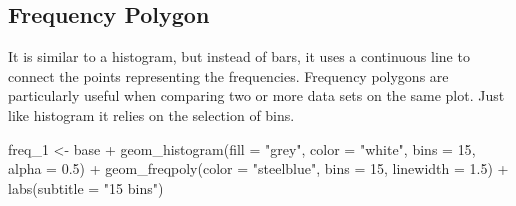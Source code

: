 \documentclass[
  letterpaper,
]{book}
\newenvironment{Shaded}{\begin{snugshade}}{\end{snugshade}}
\newcommand{\AttributeTok}[1]{\textcolor[rgb]{0.40,0.45,0.13}{#1}}
\newcommand{\DecValTok}[1]{\textcolor[rgb]{0.68,0.00,0.00}{#1}}
\newcommand{\FloatTok}[1]{\textcolor[rgb]{0.68,0.00,0.00}{#1}}
\newcommand{\FunctionTok}[1]{\textcolor[rgb]{0.28,0.35,0.67}{#1}}
\newcommand{\NormalTok}[1]{\textcolor[rgb]{0.00,0.23,0.31}{#1}}
\newcommand{\OtherTok}[1]{\textcolor[rgb]{0.00,0.23,0.31}{#1}}
\newcommand{\SpecialCharTok}[1]{\textcolor[rgb]{0.37,0.37,0.37}{#1}}
\newcommand{\StringTok}[1]{\textcolor[rgb]{0.13,0.47,0.30}{#1}}
\begin{document}
\hypertarget{frequency-polygon}{%
\subsection{Frequency Polygon}\label{frequency-polygon}}

It is similar to a histogram, but instead of bars, it uses a continuous
line to connect the points representing the frequencies. Frequency
polygons are particularly useful when comparing two or more data sets on
the same plot. Just like histogram it relies on the selection of bins.

\begin{Shaded}
\begin{Highlighting}[]
\NormalTok{freq\_1 }\OtherTok{\textless{}{-}}\NormalTok{ base }\SpecialCharTok{+} \FunctionTok{geom\_histogram}\NormalTok{(}\AttributeTok{fill =} \StringTok{"grey"}\NormalTok{, }\AttributeTok{color =} \StringTok{"white"}\NormalTok{, }\AttributeTok{bins =} \DecValTok{15}\NormalTok{, }\AttributeTok{alpha =} \FloatTok{0.5}\NormalTok{) }\SpecialCharTok{+} \FunctionTok{geom\_freqpoly}\NormalTok{(}\AttributeTok{color =} \StringTok{"steelblue"}\NormalTok{, }\AttributeTok{bins =} \DecValTok{15}\NormalTok{, }\AttributeTok{linewidth =} \FloatTok{1.5}\NormalTok{) }\SpecialCharTok{+} \FunctionTok{labs}\NormalTok{(}\AttributeTok{subtitle =} \StringTok{"15 bins"}\NormalTok{)}


\end{Highlighting}
\end{Shaded}
\end{document}
